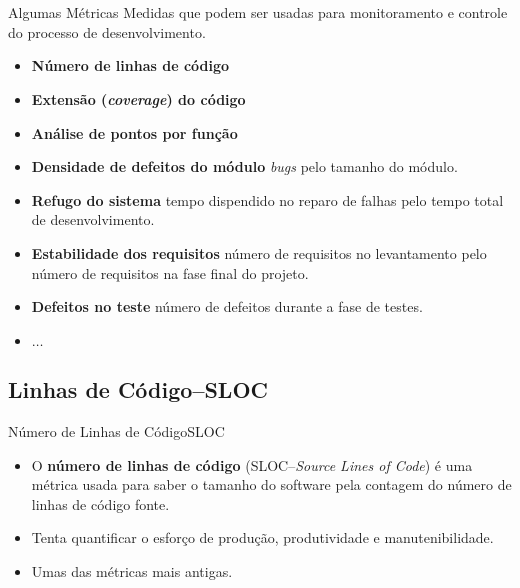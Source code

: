 
\lecturetitle{\insertlecture}{\course}

\frame{\maketitle}

\section{\insertlecture}


\begin{frame}{Algumas Métricas}
  \scriptsize
  Medidas que podem ser usadas para monitoramento e controle 
  do processo de desenvolvimento.

  \begin{itemize}[<+-| alert@+>]
  \item {\bf Número de linhas de código}
  \item {\bf Extensão ({\it coverage}) do código}
  \item {\bf Análise de pontos por função}
  \item {\bf Densidade de defeitos do módulo} {\it bugs\/} pelo tamanho do módulo.
  \item {\bf Refugo do sistema} tempo dispendido no reparo de falhas pelo tempo 
    total de desenvolvimento.
  \item {\bf Estabilidade dos requisitos} número de requisitos no levantamento pelo 
    número de requisitos na fase final do projeto.
  \item {\bf Defeitos no teste} número de defeitos durante a fase de testes.
  \item $\ldots$
  \end{itemize}
\end{frame}

\subsection{Linhas de Código--SLOC}

\begin{frame}{Número de Linhas de Código}{SLOC}
\begin{itemize}[<+-| alert@+>]
\item O {\bf número de linhas de código} (SLOC--{\em Source Lines of
    Code}) é uma métrica usada para saber o tamanho do software pela
  contagem do número de linhas de código fonte.
\item Tenta quantificar o esforço de produção, produtividade e
  manutenibilidade.
\item Umas das métricas mais antigas.
\end{itemize}
\end{frame}

